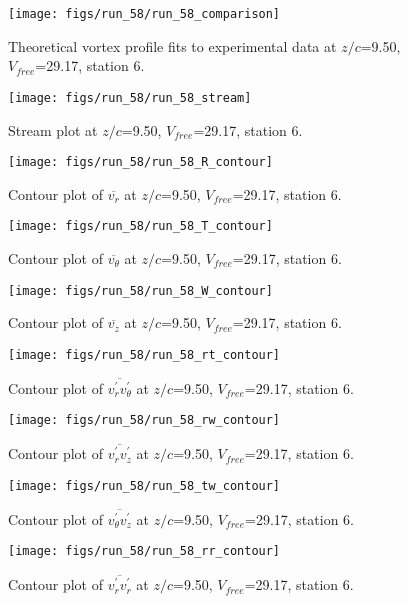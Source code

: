\begin{figure}[H]
\centering
\texttt{[image: figs/run\_58/run\_58\_comparison]}
\caption{Theoretical vortex profile fits to experimental data at $z/c$=9.50, $V_{free}$=29.17, station 6.}
\end{figure}


\begin{figure}[H]
\centering
\texttt{[image: figs/run\_58/run\_58\_stream]}
\caption{Stream plot at $z/c$=9.50, $V_{free}$=29.17, station 6.}
\end{figure}


\begin{figure}[H]
\centering
\texttt{[image: figs/run\_58/run\_58\_R\_contour]}
\caption{Contour plot of $\overline{v_{r}}$ at $z/c$=9.50, $V_{free}$=29.17, station 6.}
\end{figure}


\begin{figure}[H]
\centering
\texttt{[image: figs/run\_58/run\_58\_T\_contour]}
\caption{Contour plot of $\overline{v_{\theta}}$ at $z/c$=9.50, $V_{free}$=29.17, station 6.}
\end{figure}


\begin{figure}[H]
\centering
\texttt{[image: figs/run\_58/run\_58\_W\_contour]}
\caption{Contour plot of $\overline{v_{z}}$ at $z/c$=9.50, $V_{free}$=29.17, station 6.}
\end{figure}


\begin{figure}[H]
\centering
\texttt{[image: figs/run\_58/run\_58\_rt\_contour]}
\caption{Contour plot of $\overline{v_{r}^{\prime} v_{\theta}^{\prime}}$ at $z/c$=9.50, $V_{free}$=29.17, station 6.}
\end{figure}


\begin{figure}[H]
\centering
\texttt{[image: figs/run\_58/run\_58\_rw\_contour]}
\caption{Contour plot of $\overline{v_{r}^{\prime} v_{z}^{\prime}}$ at $z/c$=9.50, $V_{free}$=29.17, station 6.}
\end{figure}


\begin{figure}[H]
\centering
\texttt{[image: figs/run\_58/run\_58\_tw\_contour]}
\caption{Contour plot of $\overline{v_{\theta}^{\prime} v_{z}^{\prime}}$ at $z/c$=9.50, $V_{free}$=29.17, station 6.}
\end{figure}


\begin{figure}[H]
\centering
\texttt{[image: figs/run\_58/run\_58\_rr\_contour]}
\caption{Contour plot of $\overline{v_{r}^{\prime} v_{r}^{\prime}}$ at $z/c$=9.50, $V_{free}$=29.17, station 6.}
\end{figure}


